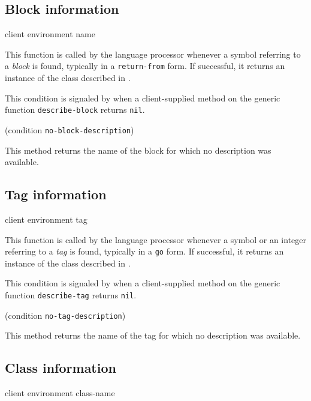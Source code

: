 \subsection{Block information}

{\footnotesize
{} {client environment name}
}

This function is called by the language processor whenever a symbol
referring to a \emph{block} is found, typically in a
\texttt{return-from} form.  If successful, it returns an instance of
the class described in
.

{\footnotesize
{}
}

This condition is signaled by \sysname{} when a client-supplied method
on the generic function \texttt{describe-block} returns \texttt{nil}.

{\footnotesize
{} {(condition {\tt no-block-description})}
}

This method returns the name of the block for which no description was
available.

\subsection{Tag information}

{\footnotesize
{} {client environment tag}
}

This function is called by the language processor whenever a symbol or
an integer referring to a \emph{tag} is found, typically in a
\texttt{go} form.  If successful, it returns an instance of the
class described in .

{\footnotesize
{}
}

This condition is signaled by \sysname{} when a client-supplied method
on the generic function \texttt{describe-tag} returns \texttt{nil}.

{\footnotesize
{} {(condition {\tt no-tag-description})}
}

This method returns the name of the tag for which no description was
available.

\subsection{Class information}

{\footnotesize
{} {client environment class-name}
}

